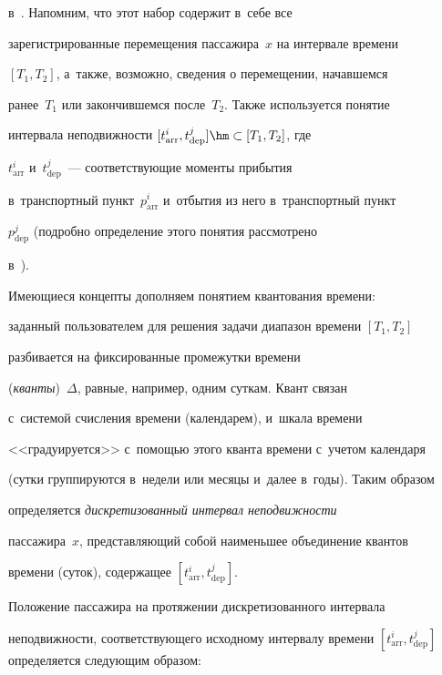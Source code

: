 в~\cite{3-bi}. Напомним, что этот набор содержит в~себе все 


зарегистрированные перемещения пассажира~$x$ на интервале времени 


$[T_1, T_2]$, а~также, возможно, сведения о перемещении, начавшемся 


ранее~$T_1$ или закончившемся после~$T_2$. Также используется понятие 


интервала неподвижности $[t^i_{\mathrm{arr}}, t^j_{\mathrm{dep}}] \hm\subset [T_1, T_2]$, где 


$t^i_{\mathrm{arr}}$ и~$t^j_{\mathrm{dep}}$~--- соответствующие моменты прибытия 


в~транспортный пункт~$p^i_{\mathrm{arr}}$ и~отбытия из него в~транспортный пункт 


$p^j_{\mathrm{dep}}$ (подробно определение этого понятия рассмотрено  


в~\cite{3-bi}).


      


      Имеющиеся концепты дополняем понятием квантования времени: 


заданный пользователем для решения задачи диапазон времени $[T_1, T_2]$ 


разбивается на фиксированные промежутки времени 


(\textit{кванты})~$\Delta$, равные, например, одним суткам. Квант связан 


с~системой счисления времени (календарем), и~шкала времени 


<<градуируется>> с~по\-мощью этого кванта времени с~учетом календаря 


(сутки группируются в~недели или месяцы и~далее в~годы). Таким образом 


определяется \textit{дискретизованный интервал неподвижности} 


пассажира~$x$, представляющий собой наименьшее объединение квантов 


времени (суток), содержащее $[t^i_{\mathrm{arr}}, t^j_{\mathrm{dep}}]$.


      


      Положение пассажира на протяжении дискретизованного интервала 


неподвижности, соответствующего исходному интервалу времени $[t^i_{\mathrm{arr}}, 


t^j_{\mathrm{dep}}]$ определяется следующим образом:


